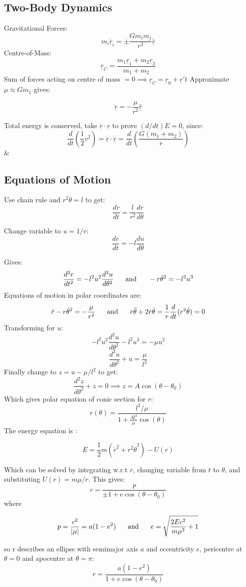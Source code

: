 \documentclass[table,cmyk,fleqn]{article}
\begin{document}
\begin{longtable}
\subsection*{Two-Body Dynamics}
Gravitational Forces:
\[m_i\ddot{\underline{r}}_i=\pm \frac{Gm_im_j}{r^2}\underline{\hat{r}}\]
Centre-of-Mass:
\[\underline{r}_C = \frac{m_1\underline{r}_1 + m_2\underline{r}_2}{m_1+m_2}\]
Sum of forces acting on centre of mass $= 0 \implies \underline{r}_C = \underline{r}_0 + \underline{r}'t$
Approximate $\mu \approx Gm_1$ gives:
\begin{boldmath}\[\ddot{\underline{r}} = -\frac{\mu}{r^2}\underline{\hat{r}}\]\end{boldmath}
Total energy is conserved, take $\ddot{\underline{r}}\cdot\underline{r}$ to prove $(d/dt) E = 0$, since:
\[\frac{d}{dt}\left(\frac{1}{2}v^2\right) = \underline{\ddot{r}}\cdot\underline{\dot{r}} =  \frac{d}{dt}\left(\frac{G(m_1+m_2)}{r}\right)\]
&
\subsection*{Equations of Motion}
Use chain rule and $r^2\dot{\theta} = l$ to get:
\[\frac{dr}{dt} = \frac{l}{r^2}\frac{dr}{d\theta}\]

Change variable to $u = 1/r$:
\[\frac{dr}{dt} = -l \frac{du}{d\theta}\]

Gives:
\[\frac{d^2r}{dt^2} = -l^2u^2\frac{d^2u}{d\theta^2}\text{\hspace{0.6cm}and\hspace{0.6cm}} -r\dot{\theta}^2 = -l^2u^3\]
Equations of motion in polar coordinates are:
\[\ddot{r} - r\dot{\theta}^2 = -\frac{\mu}{r^2}\text{\hspace{0.6cm}and\hspace{0.6cm}}r\ddot{\theta}+2\dot{r}\dot{\theta} = \frac{1}{r}\frac{d}{dt}(r^2\dot{\theta})=0\]
Transforming for $u$:
\[-l^2u^2\frac{d^2u}{d\theta^2}-l^2u^3 = -\mu u^2\]
\[\frac{d^2u}{d\theta^2}+u = \frac{\mu}{l^2}\]
Finally change to $z = u-\mu/l^2$ to get:
\[\frac{d^2z}{d\theta^2}+z = 0 \implies z = A\cos(\theta-\theta_0)\]
Which gives polar equation of conic section for $r$:
\[r(\theta) = \frac{l^2/\mu}{1+\frac{Al^2}{\mu}\cos(\theta)}\]
The energy equation is :
\begin{boldmath}\[E = \frac{1}{2}m(\dot{r}^2+r^2\dot{\theta}^2)-U(r)\]\end{boldmath}
Which can be solved by integrating w.r.t $r$, changing variable from $t$ to $\theta$, and substituting $U(r) = m\mu/r$. This gives:
\[r = \frac{p}{\pm1+e\cos(\theta-\theta_0)}\]
where
\begin{boldmath}\[p = \frac{c^2}{|\mu|}=a(1-e^2)\text{\hspace{0.6cm}and\hspace{0.6cm}}e = \sqrt{\frac{2Ec^2}{m\mu^2}+1}\]\end{boldmath}
so r describes an ellipse with semimajor axis $a$ and eccentricity $e$, pericentre at $\theta=0$ and apocentre at $\theta=\pi$:
\[r = \frac{a(1-e^2)}{1+e\cos(\theta-\theta_0)}\]




\end{longtable}
\end{document}
